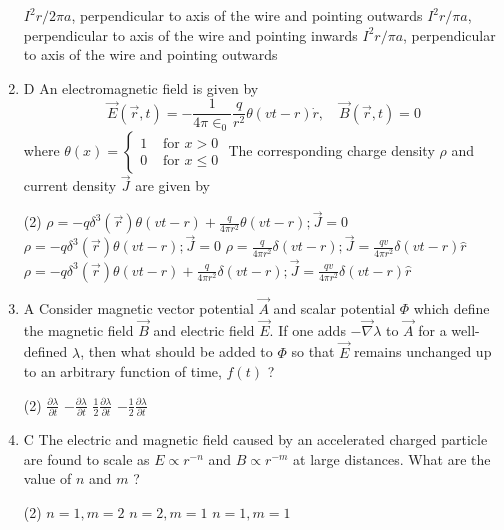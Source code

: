 \begin{enumerate}
\begin{tasks}
		\task[\textbf{B.}]$I^{2} r / 2 \pi a$, perpendicular to axis of the wire and pointing outwards
		\task[\textbf{C.}]$I^{2} r / \pi a$, perpendicular to axis of the wire and pointing inwards
		\task[\textbf{D.}]$I^{2} r / \pi a$, perpendicular to axis of the wire and pointing outwards
	\end{tasks}
\item D An electromagnetic field is given by
$$
\vec{E}(\vec{r}, t)=-\frac{1}{4 \pi \in_{0}} \frac{q}{r^{2}} \theta(v t-r) \dot{r}, \quad \vec{B}(\vec{r}, t)=0
$$
where $\theta(x)= \begin{cases}1 & \text { for } x>0 \\ 0 & \text { for } x \leq 0\end{cases}$
The corresponding charge density $\rho$ and current density $\vec{J}$ are given by
{}
 \begin{tasks}(2)
	\task[\textbf{a.}]$\rho=-q \delta^{3}(\vec{r}) \theta(v t-r)+\frac{q}{4 \pi r^{2}} \theta(v t-r) ; \vec{J}=0$
	\task[\textbf{b.}]$\rho=-q \delta^{3}(\vec{r}) \theta(v t-r) ; \vec{J}=0$
	\task[\textbf{c.}]$\rho=\frac{q}{4 \pi r^{2}} \delta(v t-r) ; \vec{J}=\frac{q v}{4 \pi r^{2}} \delta(v t-r) \hat{r}$
	\task[\textbf{d.}] $\rho=-q \delta^{3}(\vec{r}) \theta(v t-r)+\frac{q}{4 \pi r^{2}} \delta(v t-r) ; \vec{J}=\frac{q v}{4 \pi r^{2}} \delta(v t-r) \hat{r}$
\end{tasks}
\item A Consider magnetic vector potential $\vec{A}$ and scalar potential $\Phi$ which define the magnetic field $\vec{B}$ and electric field $\vec{E}$. If one adds $-\vec{\nabla} \lambda$ to $\vec{A}$ for a well-defined $\lambda$, then what should be added to $\Phi$ so that $\vec{E}$ remains unchanged up to an arbitrary function of time, $f(t)$ ?
{}
 \begin{tasks}(2)
	\task[\textbf{a.}]$\frac{\partial \lambda}{\partial t}$
	\task[\textbf{b.}]$-\frac{\partial \lambda}{\partial t}$
	\task[\textbf{c.}] $\frac{1}{2} \frac{\partial \lambda}{\partial t}$
	\task[\textbf{d.}]  $-\frac{1}{2} \frac{\partial \lambda}{\partial t}$
\end{tasks}
\item C The electric and magnetic field caused by an accelerated charged particle are found to scale as $E \propto r^{-n}$ and $B \propto r^{-m}$ at large distances. What are the value of $n$ and $m$ ?
{}
 \begin{tasks}(2)
	\task[\textbf{a.}]$n=1, m=2$
	\task[\textbf{b.}]$n=2, m=1$
	\task[\textbf{c.}]$n=1, m=1$

\end{tasks}
\end{enumerate}

